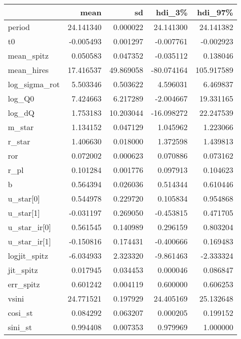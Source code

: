 \begin{tabular}{lrrrr}
\toprule
{} &       mean &         sd &     hdi\_3\% &     hdi\_97\% \\
\midrule
period        &  24.141340 &   0.000022 &  24.141300 &   24.141382 \\
t0            &  -0.005493 &   0.001297 &  -0.007761 &   -0.002923 \\
mean\_spitz    &   0.050583 &   0.047352 &  -0.035112 &    0.138046 \\
mean\_hires    &  17.416537 &  49.869058 & -80.074164 &  105.917589 \\
log\_sigma\_rot &   5.503346 &   0.503622 &   4.596031 &    6.469837 \\
log\_Q0        &   7.424663 &   6.217289 &  -2.004667 &   19.331165 \\
log\_dQ        &   1.753183 &  10.203044 & -16.098272 &   22.247539 \\
m\_star        &   1.134152 &   0.047129 &   1.045962 &    1.223066 \\
r\_star        &   1.406630 &   0.018000 &   1.372598 &    1.439813 \\
ror           &   0.072002 &   0.000623 &   0.070886 &    0.073162 \\
r\_pl          &   0.101284 &   0.001776 &   0.097913 &    0.104623 \\
b             &   0.564394 &   0.026036 &   0.514344 &    0.610446 \\
u\_star[0]     &   0.544978 &   0.229720 &   0.105834 &    0.954868 \\
u\_star[1]     &  -0.031197 &   0.269050 &  -0.453815 &    0.471705 \\
u\_star\_ir[0]  &   0.561545 &   0.140989 &   0.296159 &    0.803204 \\
u\_star\_ir[1]  &  -0.150816 &   0.174431 &  -0.400666 &    0.169483 \\
logjit\_spitz  &  -6.034933 &   2.323320 &  -9.861463 &   -2.333324 \\
jit\_spitz     &   0.017945 &   0.034453 &   0.000046 &    0.086847 \\
err\_spitz     &   0.601242 &   0.004119 &   0.600000 &    0.606253 \\
vsini         &  24.771521 &   0.197929 &  24.405169 &   25.132648 \\
cosi\_st       &   0.084292 &   0.063207 &   0.000205 &    0.199152 \\
sini\_st       &   0.994408 &   0.007353 &   0.979969 &    1.000000 \\

\end{tabular}

